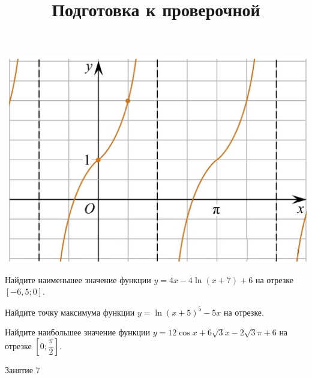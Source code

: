\begin{homework}[number=3]
\begin{listofex}
\begin{minipage}[t]{\picwidth}
			\includegraphics[align=t, width=\linewidth]{../pics/MECGERM6H3-2.jpg}
		\end{minipage}
		\item Найдите наименьшее значение функции \( y=4x-4 \ln(x+7)+6 \) на отрезке \( [-6,5;0] \). %
		\item Найдите точку максимума функции \( y=\ln(x+5)^5-5x \) на отрезке. %
		\item Найдите наибольшее значение функции \( y=12\cos x + 6\sqrt{3} x - 2 \sqrt{3} \pi + 6 \) на отрезке \( \left[ 0; \dfrac{ \pi }{ 2 } \right]  \).
	\end{listofex}
\end{homework}

\begin{class}[number=7]
	\title{Подготовка к проверочной}
	\begin{listofex}
		\item Занятие 7
	\end{listofex}
\end{class}

